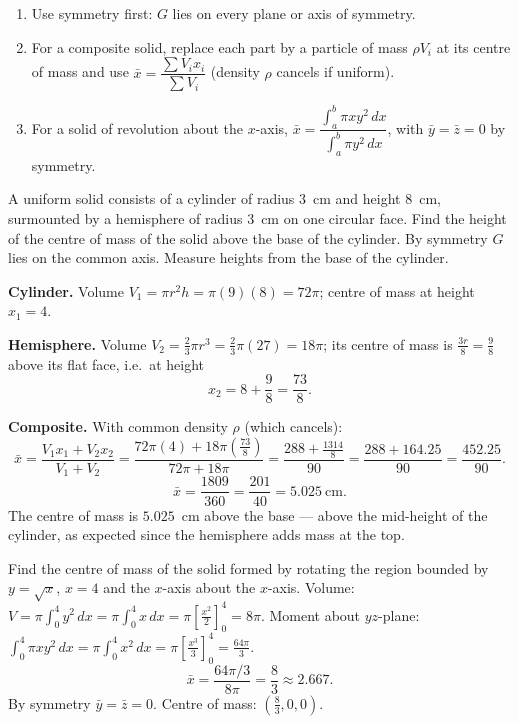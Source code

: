 \documentclass[11pt]{article}
\newcommand{\cle}[1]{{\popxbold\color{popdark}#1}}
\begin{document}
\begin{methode}
\begin{enumerate}
\item Use \cle{symmetry} first: $G$ lies on every plane or axis of symmetry.
\item For a \cle{composite solid}, replace each part by a particle of mass $\rho V_i$ at its centre of mass and use $\bar{x}=\dfrac{\sum V_i x_i}{\sum V_i}$ (density $\rho$ cancels if uniform).
\item For a \cle{solid of revolution} about the $x$-axis, $\bar{x}=\dfrac{\displaystyle\int_a^b \pi x y^2\,dx}{\displaystyle\int_a^b \pi y^2\,dx}$, with $\bar y=\bar z=0$ by symmetry.
\end{enumerate}
\end{methode}

\begin{exoresolu}
A uniform solid consists of a cylinder of radius $3$~cm and height $8$~cm, surmounted by a hemisphere of radius $3$~cm on one circular face. Find the height of the centre of mass of the solid above the base of the cylinder.
\tcblower
By symmetry $G$ lies on the common axis. Measure heights from the base of the cylinder.

\textbf{Cylinder.} Volume $V_1=\pi r^2 h=\pi(9)(8)=72\pi$; centre of mass at height $x_1=4$.

\textbf{Hemisphere.} Volume $V_2=\tfrac23\pi r^3=\tfrac23\pi(27)=18\pi$; its centre of mass is $\tfrac{3r}{8}=\tfrac98$ above its flat face, i.e.\ at height
\[
x_2=8+\frac98=\frac{73}{8}.
\]

\textbf{Composite.} With common density $\rho$ (which cancels):
\[
\bar{x}=\frac{V_1 x_1+V_2 x_2}{V_1+V_2}=\frac{72\pi(4)+18\pi\left(\tfrac{73}{8}\right)}{72\pi+18\pi}
=\frac{288+\tfrac{1314}{8}}{90}=\frac{288+164.25}{90}=\frac{452.25}{90}.
\]
\[
\bar{x}=\frac{1809}{360}=\frac{201}{40}=5.025\ \text{cm}.
\]
The centre of mass is $5.025$~cm above the base — above the mid-height of the cylinder, as expected since the hemisphere adds mass at the top.
\end{exoresolu}

\begin{exoresolu}
Find the centre of mass of the solid formed by rotating the region bounded by $y=\sqrt{x}$, $x=4$ and the $x$-axis about the $x$-axis.
\tcblower
Volume: $V=\pi\int_0^4 y^2\,dx=\pi\int_0^4 x\,dx=\pi\left[\frac{x^2}{2}\right]_0^4=8\pi$.
Moment about $yz$-plane: $\int_0^4 \pi x y^2\,dx=\pi\int_0^4 x^2\,dx=\pi\left[\frac{x^3}{3}\right]_0^4=\frac{64\pi}{3}$.
\[
\bar{x}=\frac{64\pi/3}{8\pi}=\frac{8}{3}\approx 2.667.
\]
By symmetry $\bar{y}=\bar{z}=0$. Centre of mass: $\left(\frac{8}{3},0,0\right)$.
\end{exoresolu}
\end{document}
